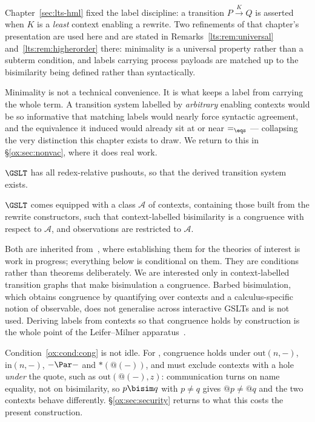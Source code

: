 Chapter~\ref{sec:lts-hml} fixed the label discipline: a transition
$P \xrightarrow{K} Q$ is asserted when $K$ is a \emph{least} context enabling a
rewrite. Two refinements of that chapter's presentation are used here and are
stated in Remarks~\ref{lts:rem:universal} and~\ref{lts:rem:higherorder} there:
minimality is a universal property rather than a subterm condition, and labels
carrying process payloads are matched up to the bisimilarity being defined rather
than syntactically.

Minimality is not a technical convenience. It is what keeps a label from carrying
the whole term. A transition system labelled by \emph{arbitrary} enabling contexts
would be so informative that matching labels would nearly force syntactic
agreement, and the equivalence it induced would already sit at or near $=_{\eqs}$
--- collapsing the very distinction this chapter exists to draw. We return to this
in \S\ref{ox:sec:nonvac}, where it does real work.

\begin{condition}
\label{ox:cond:rpo}
$\GSLT$ has all redex-relative pushouts, so that the derived transition system
exists.
\end{condition}

\begin{condition}[Congruence]
\label{ox:cond:cong}
$\GSLT$ comes equipped with a class $\mathcal{A}$ of contexts, containing those
built from the rewrite constructors, such that context-labelled bisimilarity is a
congruence with respect to $\mathcal{A}$, and observations are restricted to
$\mathcal{A}$.
\end{condition}

Both are inherited from~\cite{BIHOL}, where establishing them for the theories of
interest is work in progress; everything below is conditional on them. They are
conditions rather than theorems deliberately. We are interested only in
context-labelled transition graphs that make bisimulation a congruence. Barbed
bisimulation, which obtains congruence by quantifying over contexts and a
calculus-specific notion of observable, does not generalise across interactive
GSLTs and is not used. Deriving labels from contexts so that congruence holds by
construction is the whole point of the Leifer--Milner
apparatus~\cite{leifer2000deriving}.

Condition~\ref{ox:cond:cong} is not idle. For \rhoc, congruence holds under
$\mathrm{out}(n,-)$, $\mathrm{in}(n,-)$, $-\Par-$ and $\ast(@(-))$, and must
exclude contexts with a hole \emph{under} the quote, such as
$\mathrm{out}(@(-),z)$: communication turns on name equality, not on
bisimilarity, so $p \bisim q$ with $p \neq q$ gives $@p \neq @q$ and the two
contexts behave differently. \S\ref{ox:sec:security} returns to what this costs
the present construction.


